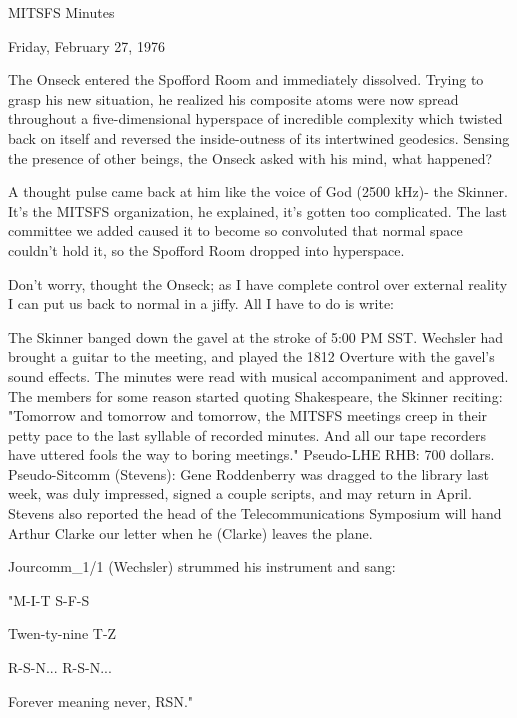 \documentclass[12pt]{article}
\begin{document}
\begin{center}

MITSFS Minutes

Friday, February 27, 1976

\end{center}
 
\vspace{12pt}

\setlength{\parskip}{6pt}

\noindent
The Onseck entered the Spofford Room and immediately dissolved. Trying to grasp his new situation, he realized his composite atoms were now spread throughout a five-dimensional hyperspace of incredible complexity which twisted back on itself and reversed the inside-outness of its intertwined geodesics. Sensing the presence of other beings, the Onseck asked with his mind, what happened?

A thought pulse came back at him like the voice of God (2500 kHz)- the Skinner. It's the MITSFS organization, he explained, it's gotten too complicated. The last committee we added caused it to become so convoluted that normal space couldn't hold it, so the Spofford Room dropped into hyperspace.

Don't worry, thought the Onseck; as I have complete control
over external reality I can put us back to normal in a jiffy. All I have to do is write:

The Skinner banged down the gavel at the stroke of 5:00 PM SST. Wechsler had brought a guitar to the meeting, and played the 1812 Overture with the gavel's sound effects. The minutes were read with musical accompaniment and approved. The members for some reason started quoting Shakespeare, the Skinner reciting: "Tomorrow and tomorrow and tomorrow, the MITSFS meetings creep in their petty pace to the last syllable of recorded minutes. And all our tape recorders have uttered fools the way to boring meetings." Pseudo-LHE RHB: 700 dollars. Pseudo-Sitcomm (Stevens): Gene Roddenberry was dragged to the library last week, was duly impressed, signed a couple scripts, and may return in April. Stevens also reported the head of the Telecommunications Symposium will hand Arthur Clarke our letter when he (Clarke) leaves the plane.

Jourcomm_1/1 (Wechsler) strummed his instrument and sang:

"M-I-T S-F-S

Twen-ty-nine T-Z

R-S-N... R-S-N...

Forever meaning never, RSN."
\end{document}
